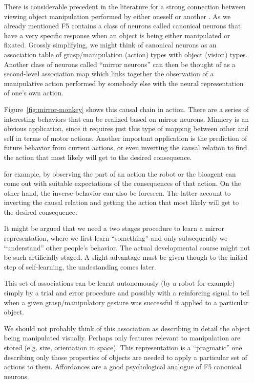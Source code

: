 \ifverbose
There is considerable precedent in the literature for a strong
connection between viewing object manipulation performed by either
oneself or another \cite{wohlsclager02human}.  As we already mentioned
F5 contains a class of neurons called canonical neurons that have a
very specific response when an object is being either manipulated or
fixated.  Grossly simplifying, we might think of canonical neurons as
an association table of grasp/manipulation (action) types with object
(vision) types.  Another class of neurons called ``mirror neurons''
can then be thought of as a second-level association map which links
together the observation of a manipulative action performed by
somebody else with the neural representation of one's own action.
\fi

Figure~\ref{fig:mirror-monkey} shows this causal chain in action.
There are a series of interesting behaviors that can be realized based
on mirror neurons. Mimicry is an obvious application, since it
requires just this type of mapping between other and self in terms of
motor actions.  Another important application is the prediction of
future behavior from current actions, or even inverting the causal
relation to find the action that most likely will get to the desired
consequence.

\ifverbose

for example, by observing the part of an action the robot or the
bioagent can come out with suitable expectations of the consequences
of that action. On the other hand, the inverse behavior can also be
foreseen. The latter account to inverting the causal relation and
getting the action that most likely will get to the desired
consequence.

It might be argued that we need a two stages procedure to learn a
mirror representation, where we first learn ``something'' and only
subsequently we ``understand'' other people's behavior. The actual
developmental course might not be such artificially staged. A slight
advantage must be given though to the initial step of self-learning,
the undestanding comes later.


This set of associations can be learnt autonomously (by a robot for
example) simply by a trial and error procedure and possibly with a
reinforcing signal to tell when a given grasp/manipulatory gesture was
successful if applied to a particular object.

We should not probably think of this association as describing in
detail the object being manipulated visually. Perhaps only features
relevant to manipulation are stored (e.g. size, orientation in space).
This representation is a ``pragmatic'' one describing only those
properties of objects are needed to apply a particular set of actions
to them. Affordances are a good psychological analogue of F5
canonical neurons.
\fi


